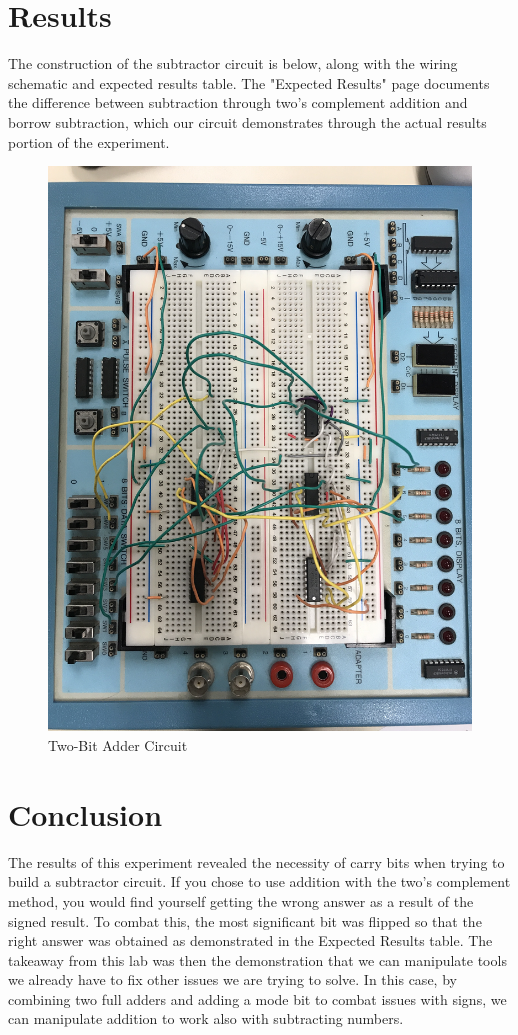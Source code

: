 \documentclass[11pt]{article}
\begin{document}
\section*{Results}

The construction of the subtractor circuit is below, along with the wiring schematic and expected results table. The "Expected Results" page documents the difference between subtraction through two's complement addition and borrow subtraction, which our circuit demonstrates through the actual results portion of the experiment.
\clearpage
\begin{figure}
	\includegraphics[width=1.0\textwidth]{"Circuit Picture"}
	\caption{Two-Bit Adder Circuit}
\end{figure}


\section*{Conclusion}
The results of this experiment revealed the necessity of carry bits when trying to build a subtractor circuit. If you chose to use addition with the two's complement method, you would find yourself getting the wrong answer as a result of the signed result. To combat this, the most significant bit was flipped so that the right answer was obtained as demonstrated in the Expected Results table. The takeaway from this lab was then the demonstration that we can manipulate tools we already have to fix other issues we are trying to solve. In this case, by combining two full adders and adding a mode bit to combat issues with signs, we can manipulate addition to work also with subtracting numbers.
\end{document}
